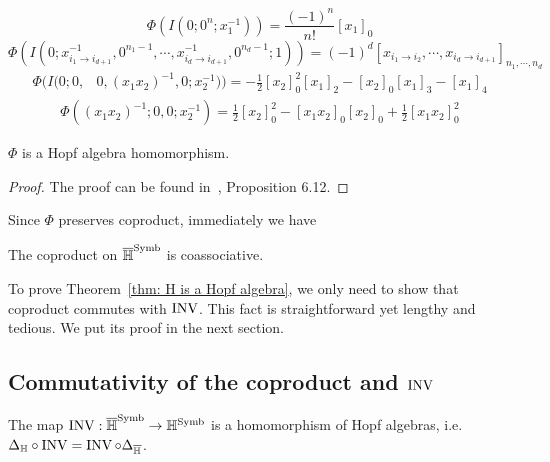 \begin{example}
\[
\Phi(I(0;0^n;x_1^{-1}))=\frac{(-1)^n}{n!}[x_1]_0
\]
\[
\Phi(I(0;x_{i_1\to i_{d+1}}^{-1},0^{n_1-1},\cdots,x_{i_d\to i_{d+1}}^{-1},0^{n_d-1};1))=(-1)^d[x_{i_1\to i_2},\cdots,x_{i_d\to i_{d+1}}]_{n_1,\cdots,n_d}
\]
\begin{align*}
\Phi(I(0;0,&0,(x_1x_2)^{-1},0;x_2^{-1}))=-\frac{1}{2}[x_2]_0^2[x_1]_2-[x_2]_0[x_1]_3-[x_1]_4
\end{align*}
\begin{align*}
\Phi((x_1x_2)^{-1};0,0;x_2^{-1})=\frac{1}{2}[x_2]_0^2-[x_1x_2]_0[x_2]_0+\frac{1}{2}[x_1x_2]_0^2
\end{align*}
\end{example}

\begin{theorem}\label{thm: Phi is Hopf algebra morphism}\cite{ZDHZ_HopfAlgebrasOfMultiplePolylogarithmsAndHolomorphicOneForms}
$\Phi$ is a Hopf algebra homomorphism.
\end{theorem}

\begin{proof}
The proof can be found in~\cite{ZDHZ_HopfAlgebrasOfMultiplePolylogarithmsAndHolomorphicOneForms}, Proposition 6.12.
\end{proof}

Since $\Phi$ preserves coproduct, immediately we have

\begin{corollary}\label{cor: Hbar is coassociative}
The coproduct on $\overline{\mathbb H}^{\operatorname{Symb}}$ is coassociative.
\end{corollary}

To prove Theorem~\ref{thm: H is a Hopf algebra}, we only need to show that coproduct commutes with $\operatorname{INV}$. This fact is straightforward yet lengthy and tedious. We put its proof in the next section.

\subsection{Commutativity of the coproduct and $\operatorname{INV}$}

\begin{theorem}\label{thm: coproduct commutes with INV}
The map $\operatorname{INV}: \overline{\mathbb H}^{\operatorname{Symb}}\to\mathbb H^{\operatorname{Symb}}$ is a homomorphism of Hopf algebras, i.e. $\Delta_{\mathbb H}\circ\operatorname{INV}=\operatorname{INV}\circ\Delta_{\overline{\mathbb H}}$.
\end{theorem}

